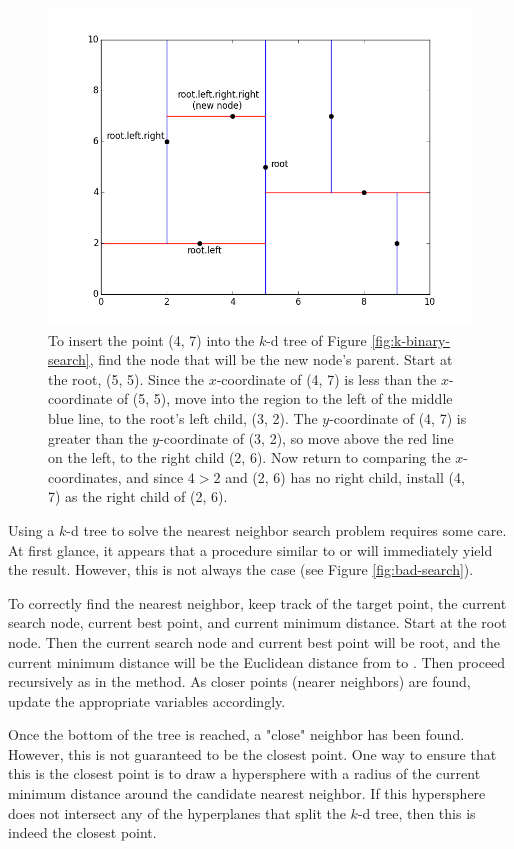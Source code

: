 \begin{figure}[H]
\includegraphics[width=.9\textwidth]{figures/kdpic2.png}
\caption{To insert the point (4, 7) into the $k$-d tree of Figure \ref{fig:k-binary-search}, find the node that will be the new node's parent. Start at the root, (5, 5). Since the $x$-coordinate of (4, 7) is less than the $x$-coordinate of (5, 5), move into the region to the left of the middle blue line, to the root's left child, (3, 2). The $y$-coordinate of (4, 7) is greater than the $y$-coordinate of (3, 2), so move above the red line on the left, to the right child (2, 6). Now return to comparing the $x$-coordinates, and since $4 > 2$ and (2, 6) has no right child, install (4, 7) as the right child of (2, 6).}
\label{fig:k-insert}
\end{figure}

Using a $k$-d tree to solve the nearest neighbor search problem requires some care.
At first glance, it appears that a procedure similar to  or  will immediately yield the result.
However, this is not always the case (see Figure \ref{fig:bad-search}).

To correctly find the nearest neighbor, keep track of the target point, the current search node, current best point, and current minimum distance.
Start at the root node.
Then the current search node and current best point will be root, and the current minimum distance will be the Euclidean distance from  to .
Then proceed recursively as in the  method.
As closer points (nearer neighbors) are found, update the appropriate variables accordingly.

Once the bottom of the tree is reached, a "close" neighbor has been found.
However, this is not guaranteed to be the closest point.
One way to ensure that this is the closest point is to draw a hypersphere with a radius of the current minimum distance around the candidate nearest neighbor.
If this hypersphere does not intersect any of the hyperplanes that split the $k$-d tree, then this is indeed the closest point.

